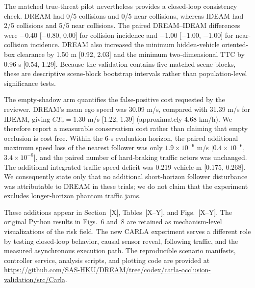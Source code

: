The matched true-threat pilot nevertheless provides a closed-loop consistency
check.  DREAM had 0/5 collisions and 0/5 near collisions, whereas IDEAM had
2/5 collisions and 5/5 near collisions.  The paired DREAM--IDEAM differences
were $-0.40$ [$-0.80$, 0.00] for collision incidence and $-1.00$
[$-1.00$, $-1.00$] for near-collision incidence.  DREAM also increased the
minimum hidden-vehicle oriented-box clearance by 1.50 m [0.92, 2.03] and the
minimum two-dimensional TTC by 0.96 s [0.54, 1.29].  Because the validation
contains five matched scene blocks, these are descriptive scene-block
bootstrap intervals rather than population-level significance tests.

The empty-shadow arm quantifies the false-positive cost requested by the
reviewer.  DREAM's mean ego speed was 30.09 m/s, compared with 31.39 m/s for
IDEAM, giving $CT_v=1.30$ m/s [1.22, 1.39] (approximately 4.68 km/h).  We
therefore report a measurable conservatism cost rather than claiming that
empty occlusion is cost free.  Within the 6-s evaluation horizon, the paired
additional maximum speed loss of the nearest follower was only
$1.9\times10^{-6}$ m/s [$0.4\times10^{-6}$,
$3.4\times10^{-6}$], and the paired number of hard-braking traffic actors was
unchanged.  The additional integrated traffic speed deficit was 0.219
vehicle-m [0.175, 0.268].  We consequently state only that no additional
short-horizon follower disturbance was attributable to DREAM in these trials;
we do not claim that the experiment excludes longer-horizon phantom traffic
jams.

These additions appear in Section~[X], Tables~[X--Y], and
Figs.~[X--Y].  The original Python results in Figs.~6 and~8 are retained as
mechanism-level visualizations of the risk field.  The new CARLA experiment
serves a different role by testing closed-loop behavior, causal sensor reveal,
following traffic, and the measured asynchronous execution path.  The
reproducible scenario manifests, controller service, analysis scripts, and
plotting code are provided at
\url{https://github.com/SAS-HKU/DREAM/tree/codex/carla-occlusion-validation/src/Carla}.
